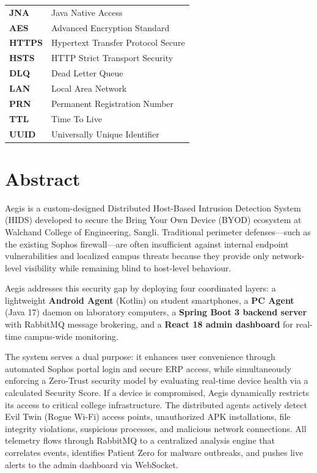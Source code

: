\documentclass[12pt,a4paper]{report}
\begin{document}
\begin{tabular}{ll}
  \textbf{JNA}      & Java Native Access \\
  \textbf{AES}      & Advanced Encryption Standard \\
  \textbf{HTTPS}    & Hypertext Transfer Protocol Secure \\
  \textbf{HSTS}     & HTTP Strict Transport Security \\
  \textbf{DLQ}      & Dead Letter Queue \\
  \textbf{LAN}      & Local Area Network \\
  \textbf{PRN}      & Permanent Registration Number \\
  \textbf{TTL}      & Time To Live \\
  \textbf{UUID}     & Universally Unique Identifier \\
\end{tabular}

\setcounter{chapter}{0}

\chapter{Abstract}

Aegis is a custom-designed Distributed Host-Based Intrusion Detection System (HIDS) developed to secure the Bring Your Own Device (BYOD) ecosystem at Walchand College of Engineering, Sangli. Traditional perimeter defenses—such as the existing Sophos firewall—are often insufficient against internal endpoint vulnerabilities and localized campus threats because they provide only network-level visibility while remaining blind to host-level behaviour.

Aegis addresses this security gap by deploying four coordinated layers: a lightweight \textbf{Android Agent} (Kotlin) on student smartphones, a \textbf{PC Agent} (Java 17) daemon on laboratory computers, a \textbf{Spring Boot 3 backend server} with RabbitMQ message brokering, and a \textbf{React 18 admin dashboard} for real-time campus-wide monitoring.

The system serves a dual purpose: it enhances user convenience through automated Sophos portal login and secure ERP access, while simultaneously enforcing a Zero-Trust security model by evaluating real-time device health via a calculated Security Score. If a device is compromised, Aegis dynamically restricts its access to critical college infrastructure. The distributed agents actively detect Evil Twin (Rogue Wi-Fi) access points, unauthorized APK installations, file integrity violations, suspicious processes, and malicious network connections. All telemetry flows through RabbitMQ to a centralized analysis engine that correlates events, identifies Patient Zero for malware outbreaks, and pushes live alerts to the admin dashboard via WebSocket.
\end{document}
